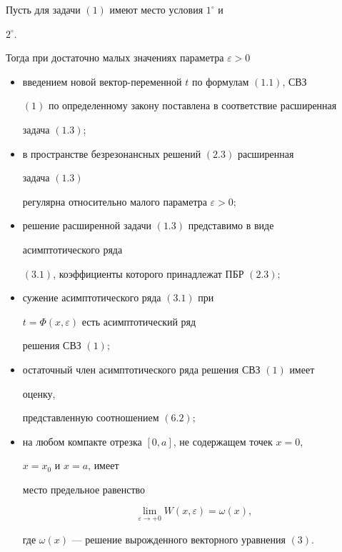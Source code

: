 \begin{thm} Пусть для задачи $(1)$ имеют место условия $1^\circ$ и 


$2^\circ$. 


Тогда при достаточно малых значениях параметра $\varepsilon>0$ 


\begin{itemize} 


\item[1)] введением новой вектор-переменной $t$ по формулам $(1.1)$, СВЗ 


$(1)$ по определенному закону поставлена в соответствие расширенная 


задача $(1.3)$; 


\item[2)] в пространстве безрезонансных решений $(2.3)$ расширенная 


задача $(1.3)$ 


регулярна относительно малого параметра $\varepsilon>0;$ 


\item[3)] решение расширенной задачи $(1.3)$ представимо в виде 


асимптотического ряда 


$(3.1)$, коэффициенты которого принадлежат ПБР $(2.3);$ 


\item[4)] сужение асимптотического ряда $(3.1)$ при 


$t=\Phi(x,\varepsilon)$ есть асимптотический ряд 


решения СВЗ $(1);$ 


\item[5)] остаточный член асимптотического ряда решения СВЗ $(1)$ имеет 


оценку, 


представленную соотношением $(6.2);$ 


\item[6)] на любом компакте отрезка $[0,a]$, не содержащем точек $x=0$, 


$x=x_0$ и $x=a$, имеет 


место предельное равенство 


$$ 


\lim_{\varepsilon\to+0}W(x,\varepsilon)=\omega(x), 


$$ 


где $\omega(x)$ --- решение вырожденного векторного уравнения $(3)$. 


\end{itemize} 


\end{thm} 


